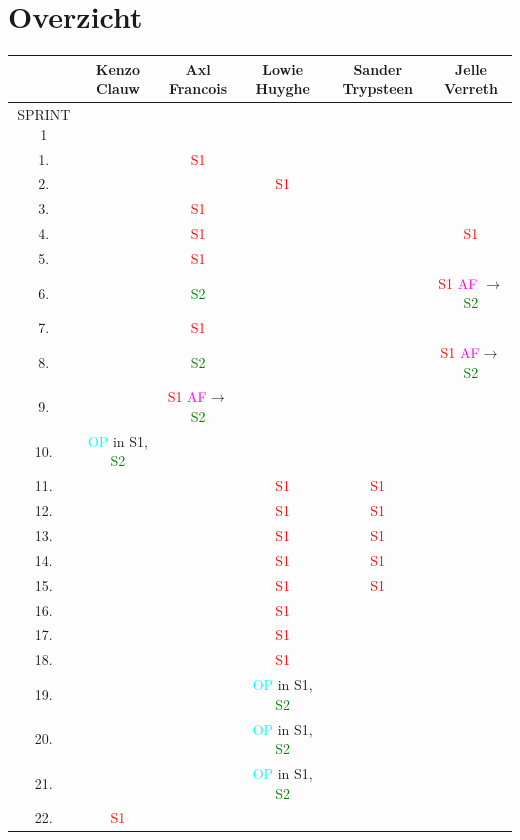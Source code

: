 \documentclass[pdftex,a4paper,12pt,twoside]{report}
\begin{document}
\section{Overzicht}

\begin{tabular}{|c|c|c|c|c|c|}
\hline  & Kenzo Clauw & Axl Francois & Lowie Huyghe & Sander Trypsteen & Jelle Verreth \\ 
\hline SPRINT 1 &  &  &  &  &  \\
\hline 1. &  & \textcolor{red}{S1} &  &  &  \\ 
\hline 2. &  &  & \textcolor{red}{S1}  &  &  \\ 
\hline 3.  &  & \textcolor{red}{S1} &  &  &  \\
\hline 4.  &  & \textcolor{red}{S1} &  &  & \textcolor{red}{S1}  \\
\hline 5.  &  & \textcolor{red}{S1} &  &  &  \\
\hline 6.  &  &\textcolor{green}{S2}   &  &  &\textcolor{red}{S1}  \textcolor{magenta}{AF} $\rightarrow$ \textcolor{green}{S2}  \\
\hline 7.  &  & \textcolor{red}{S1} &  &  &  \\
\hline 8.  &  & \textcolor{green}{S2}   &  &  & \textcolor{red}{S1} \textcolor{magenta}{AF}$\rightarrow$ \textcolor{green}{S2}  \\
\hline 9.  &  & \textcolor{red}{S1}  \textcolor{magenta}{AF}$\rightarrow$ \textcolor{green}{S2}   &  &  &  \\
\hline 10. & \textcolor{cyan}{OP} in S1, \textcolor{green}{S2} & & &  &  \\
\hline 11. &  &  & \textcolor{red}{S1} & \textcolor{red}{S1}  &  \\ 
\hline 12. &  &  &\textcolor{red}{S1}  & \textcolor{red}{S1} &  \\ 
\hline 13.  &  &  & \textcolor{red}{S1} & \textcolor{red}{S1}  &  \\
\hline 14.  &  &  & \textcolor{red}{S1} & \textcolor{red}{S1} &  \\
\hline 15.  &  &  & \textcolor{red}{S1} & \textcolor{red}{S1} &  \\
\hline 16.  &  &  &  \textcolor{red}{S1}&  &  \\
\hline 17.  &  &  & \textcolor{red}{S1} &  &  \\
\hline 18.  &  &  & \textcolor{red}{S1} &  &  \\
\hline 19. &  & &\textcolor{cyan}{OP} in S1, \textcolor{green}{S2} &  &  \\
\hline 20.&  & & \textcolor{cyan}{OP} in S1, \textcolor{green}{S2}&  &  \\
\hline 21.& & & \textcolor{cyan}{OP} in S1, \textcolor{green}{S2} &  &  \\
\hline 22. & \textcolor{red}{S1}  &  &  &  &  \\
\hline
\end{tabular}  
\end{document}
